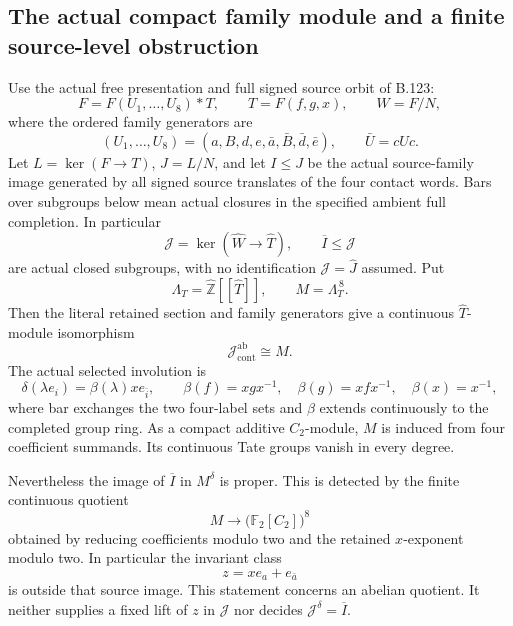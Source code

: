 \subsection*{The actual compact family module and a finite source-level obstruction}

\label{stmt:B128}
Use the actual free presentation and full signed source orbit of B.123:
\[
 F=F(U_1,\ldots,U_8)*T,\qquad T=F(f,g,x),\qquad W=F/N,
\]
where the ordered family generators are
\[
 (U_1,\ldots,U_8)=(a,B,d,e,\bar a,\bar B,\bar d,\bar e),
 \qquad \bar U=cUc.
\]
Let $L=\ker(F\to T)$, $J=L/N$, and let $I\leq J$ be the
actual source-family image generated by all signed source translates
of the four contact words. Bars over subgroups below mean actual
closures in the specified ambient full completion. In particular
\[
 \mathcal J=\ker(\widehat W\to\widehat T),\qquad
 \overline I\leq\mathcal J
\]
are actual closed subgroups, with no identification
$\mathcal J=\widehat J$ assumed. Put
\[
 \Lambda_T=\widehat{\mathbb Z}[[\widehat T]],
 \qquad M=\Lambda_T^{\,8}.
\]
Then the literal retained section and family generators give a
continuous $\widehat T$-module isomorphism
\begin{equation}\label{eq:B128-actual-module}
 \mathcal J^{\mathrm{ab}}_{\mathrm{cont}}\cong M.
\end{equation}
The actual selected involution is
\begin{equation}\label{eq:B128-module-involution}
 \delta(\lambda e_i)=\beta(\lambda)x e_{\bar i},\qquad
 \beta(f)=xgx^{-1},\quad\beta(g)=xfx^{-1},\quad\beta(x)=x^{-1},
\end{equation}
where bar exchanges the two four-label sets and $\beta$ extends
continuously to the completed group ring. As a compact additive
$C_2$-module, $M$ is induced from four coefficient summands.
Its continuous Tate groups vanish in every degree.

Nevertheless the image of $\overline I$ in $M^\delta$ is proper.
This is detected by the finite continuous quotient
\begin{equation}\label{eq:B128-finite-detector}
 M\longrightarrow\bigl(\mathbb F_2[C_2]\bigr)^8
\end{equation}
obtained by reducing coefficients modulo two and the retained
$x$-exponent modulo two. In particular the invariant class
\begin{equation}\label{eq:B128-missing-class}
 z=x e_a+e_{\bar a}
\end{equation}
is outside that source image. This statement concerns an abelian
quotient. It neither supplies a fixed lift of $z$ in $\mathcal J$
nor decides $\mathcal J^\delta=\overline I$.

